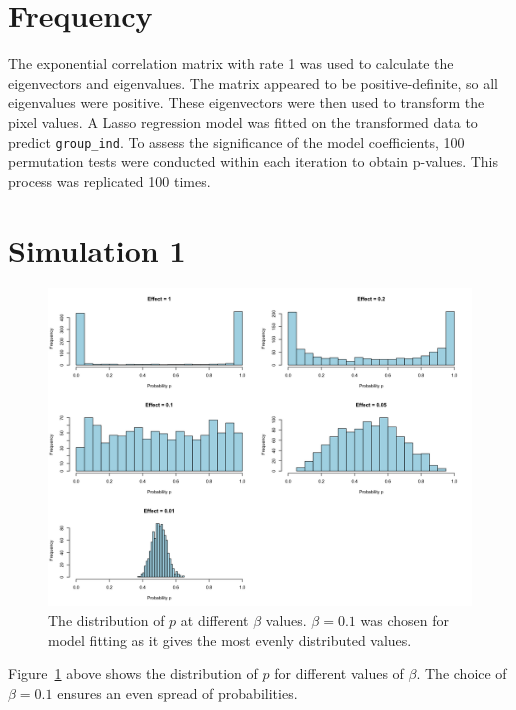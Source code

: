 \documentclass[12pt]{article}
\begin{document}
\section*{Frequency}

The exponential correlation matrix with rate 1 was used to calculate the eigenvectors and eigenvalues. The matrix appeared to be positive-definite, so all eigenvalues were positive. These eigenvectors were then used to transform the pixel values. A Lasso regression model was fitted on the transformed data to predict \texttt{group\_ind}. To assess the significance of the model coefficients, 100 permutation tests were conducted within each iteration to obtain p-values. This process was replicated 100 times.

\clearpage

\section*{Simulation 1}

\begin{figure}[H]
  \centering
  \includegraphics[width=\textwidth]{../Figures/sim1_p_dist.png}
  \caption{The distribution of \(p\) at different \(\beta\) values. \(\beta = 0.1\) was chosen for model fitting as it gives the most evenly distributed values.}
  \label{fig:sim1_p_dist}
\end{figure}

Figure~\ref{fig:sim1_p_dist} above shows the distribution of \(p\) for different values of \(\beta\). The choice of \(\beta = 0.1\) ensures an even spread of probabilities.
\end{document}
